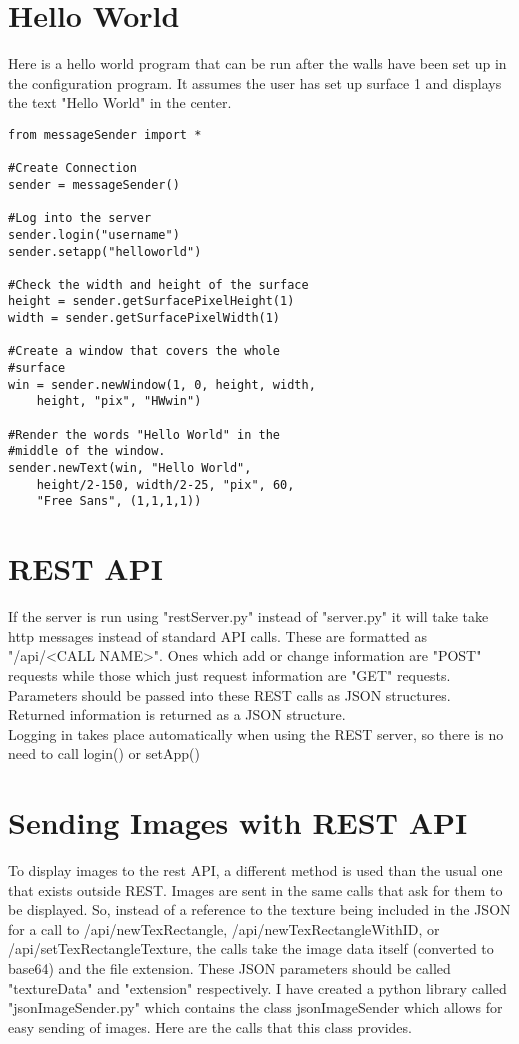 \documentclass{acm_proc_article-sp}
\begin{document}
\section{Hello World}
Here is a hello world program that can be run after the walls have been set up in the configuration program. It assumes the user has set up surface 1 and displays the text "Hello World" in the center.
\lstset{language=Python}
\begin{lstlisting}[frame=single]
from messageSender import *

#Create Connection
sender = messageSender()

#Log into the server
sender.login("username")
sender.setapp("helloworld")

#Check the width and height of the surface
height = sender.getSurfacePixelHeight(1)
width = sender.getSurfacePixelWidth(1)

#Create a window that covers the whole 
#surface
win = sender.newWindow(1, 0, height, width, 
	height, "pix", "HWwin")
	
#Render the words "Hello World" in the 
#middle of the window.
sender.newText(win, "Hello World", 
	height/2-150, width/2-25, "pix", 60, 
	"Free Sans", (1,1,1,1))
\end{lstlisting}
\section{REST API}
If the server is run using "restServer.py" instead of "server.py" it will take take http messages instead of standard API calls. These are formatted as "/api/<CALL NAME>". Ones which add or change information are "POST" requests while those which just request information are "GET" requests. Parameters should be passed into these REST calls as JSON structures. Returned information is returned as a JSON structure.\\
Logging in takes place automatically when using the REST server, so there is no need to call login() or setApp()
\section{Sending Images with REST API}
To display images to the rest API, a different method is used than the usual one that exists outside REST. Images are sent in the same calls that ask for them to be displayed. So, instead of a reference to the texture being included in the JSON for a call to /api/newTexRectangle, /api/newTexRectangleWithID, or /api/setTexRectangleTexture, the calls take the image data itself (converted to base64) and the file extension. These JSON parameters should be called "textureData" and "extension" respectively. I have created a python library called "jsonImageSender.py" which contains the class jsonImageSender which allows for easy sending of images. Here are the calls that this class provides.\\\\
\end{document}
